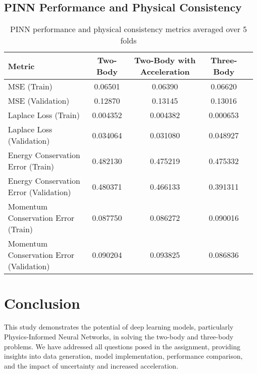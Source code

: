 \documentclass[12pt,a4paper]{article}
\begin{document}
\subsection{PINN Performance and Physical Consistency}

\begin{table}[h]
  \centering
  \begin{tabular}{lcccc}
      \hline
      Metric & Two-Body & Two-Body with Acceleration & Three-Body \\
      \hline
      MSE (Train) & 0.06501 & 0.06390 & 0.06620 \\
      MSE (Validation) & 0.12870 & 0.13145 & 0.13016 \\
      Laplace Loss (Train) & 0.004352 & 0.004382 & 0.000653 \\
      Laplace Loss (Validation) & 0.034064 & 0.031080 & 0.048927 \\
      Energy Conservation Error (Train) & 0.482130 & 0.475219 & 0.475332 \\
      Energy Conservation Error (Validation) & 0.480371 & 0.466133 & 0.391311 \\
      Momentum Conservation Error (Train) & 0.087750 & 0.086272 & 0.090016 \\
      Momentum Conservation Error (Validation) & 0.090204 & 0.093825 & 0.086836 \\
      \hline
  \end{tabular}
  \caption{PINN performance and physical consistency metrics averaged over 5 folds}
  \label{tab:pinn_performance}
\end{table}


\section{Conclusion}
\label{sec:conclusion}
This study demonstrates the potential of deep learning models, particularly Physics-Informed Neural Networks, in solving the two-body and three-body problems. We have addressed all questions posed in the assignment, providing insights into data generation, model implementation, performance comparison, and the impact of uncertainty and increased acceleration.
\end{document}
